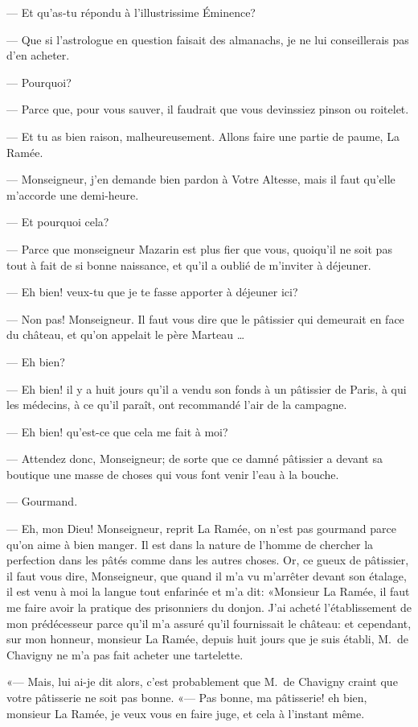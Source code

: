 — Et qu'as-tu répondu à l'illustrissime Éminence?

— Que si l'astrologue en question faisait des almanachs, je ne lui conseillerais pas d'en acheter.

— Pourquoi?

— Parce que, pour vous sauver, il faudrait que vous devinssiez pinson ou roitelet.

— Et tu as bien raison, malheureusement. Allons faire une partie de paume, La Ramée.

— Monseigneur, j'en demande bien pardon à Votre Altesse, mais il faut qu'elle m'accorde une demi-heure.

— Et pourquoi cela?

— Parce que monseigneur Mazarin est plus fier que vous, quoiqu'il ne soit pas tout à fait de si bonne naissance, et qu'il a oublié de m'inviter à déjeuner.

— Eh bien! veux-tu que je te fasse apporter à déjeuner ici?

— Non pas! Monseigneur. Il faut vous dire que le pâtissier qui demeurait en face du château, et qu'on appelait le père Marteau \dots

— Eh bien?

— Eh bien! il y a huit jours qu'il a vendu son fonds à un pâtissier de Paris, à qui les médecins, à ce qu'il paraît, ont recommandé l'air de la campagne.

— Eh bien! qu'est-ce que cela me fait à moi?

— Attendez donc, Monseigneur; de sorte que ce damné pâtissier a devant sa boutique une masse de choses qui vous font venir l'eau à la bouche.

— Gourmand.

— Eh, mon Dieu! Monseigneur, reprit La Ramée, on n'est pas gourmand parce qu'on aime à bien manger. Il est dans la nature de l'homme de chercher la perfection dans les pâtés comme dans les autres choses. Or, ce gueux de pâtissier, il faut vous dire, Monseigneur, que quand il m'a vu m'arrêter devant son étalage, il est venu à moi la langue tout enfarinée et m'a dit: «Monsieur La Ramée, il faut me faire avoir la pratique des prisonniers du donjon. J'ai acheté l'établissement de mon prédécesseur parce qu'il m'a assuré qu'il fournissait le château: et cependant, sur mon honneur, monsieur La Ramée, depuis huit jours que je suis établi, M.~de Chavigny ne m'a pas fait acheter une tartelette.

«— Mais, lui ai-je dit alors, c'est probablement que M.~de Chavigny craint que votre pâtisserie ne soit pas bonne.
«— Pas bonne, ma pâtisserie! eh bien, monsieur La Ramée, je veux vous en faire juge, et cela à l'instant même.

